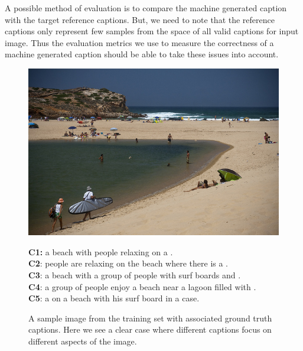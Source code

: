 A possible method of evaluation is to compare the machine generated
caption with the target reference captions.
But, we need to note that the reference captions only represent few samples from
the space of all valid captions for input image.
Thus the evaluation metrics we use to measure the correctness of a machine
generated caption should be able to take these issues into account.

\begin{figure}[h]
    \begin{minipage}[c]{0.45\linewidth}
            \includegraphics[width=\textwidth]{images/COCO_train2014_000000440903.jpg}
    \end{minipage}\hfill
    \begin{minipage}[c]{0.52\linewidth}
            \textbf{C1:} a beach with people relaxing on a . \\
            \textbf{C2}: people are relaxing on the beach where there is a . \\
            \textbf{C3}: a beach with a group of people with surf boards and . \\
            \textbf{C4}: a group of people enjoy a beach near a lagoon filled with . \\
            \textbf{C5}: a  on a beach with his surf board in a case. \\
    \end{minipage}
  \vspace*{-3mm}
  \caption{ A sample image from the training set with associated ground truth
  captions. Here we see a clear case where different captions focus on different
  aspects of the image.
  }
  \label{fig_capdiversity}
\end{figure}


